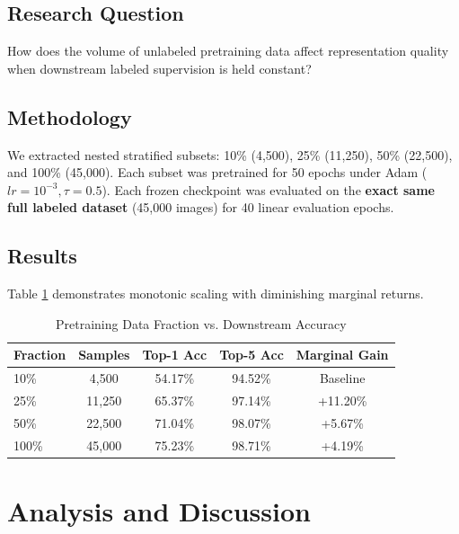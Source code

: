 \documentclass[conference]{IEEEtran}
\begin{document}
\subsection{Research Question}
How does the volume of unlabeled pretraining data affect representation quality when downstream labeled supervision is held constant?

\subsection{Methodology}
We extracted nested stratified subsets: 10\% (4,500), 25\% (11,250), 50\% (22,500), and 100\% (45,000). Each subset was pretrained for 50 epochs under Adam ($lr=10^{-3}, \tau=0.5$). Each frozen checkpoint was evaluated on the \textbf{exact same full labeled dataset} (45,000 images) for 40 linear evaluation epochs.

\subsection{Results}
Table \ref{tab:scaling} demonstrates monotonic scaling with diminishing marginal returns.

\begin{table}[htbp]
\caption{Pretraining Data Fraction vs. Downstream Accuracy}
\label{tab:scaling}
\centering
\begin{tabular}{lcccc}
\toprule
\textbf{Fraction} & \textbf{Samples} & \textbf{Top-1 Acc} & \textbf{Top-5 Acc} & \textbf{Marginal Gain} \\ \midrule
10\% & 4,500 & 54.17\% & 94.52\% & Baseline \\
25\% & 11,250 & 65.37\% & 97.14\% & +11.20\% \\
50\% & 22,500 & 71.04\% & 98.07\% & +5.67\% \\
100\% & 45,000 & 75.23\% & 98.71\% & +4.19\% \\ \bottomrule
\end{tabular}
\end{table}

\section{Analysis and Discussion}
\end{document}
